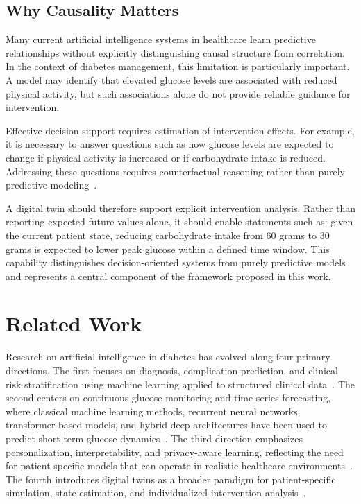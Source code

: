 \documentclass[journal]{IEEEtran}
\begin{document}
\subsection{Why Causality Matters}
Many current artificial intelligence systems in healthcare learn predictive relationships without explicitly distinguishing causal structure from correlation. In the context of diabetes management, this limitation is particularly important. A model may identify that elevated glucose levels are associated with reduced physical activity, but such associations alone do not provide reliable guidance for intervention.

Effective decision support requires estimation of intervention effects. For example, it is necessary to answer questions such as how glucose levels are expected to change if physical activity is increased or if carbohydrate intake is reduced. Addressing these questions requires counterfactual reasoning rather than purely predictive modeling~\cite{ref13,ref18,ref19}.

A digital twin should therefore support explicit intervention analysis. Rather than reporting expected future values alone, it should enable statements such as: given the current patient state, reducing carbohydrate intake from 60 grams to 30 grams is expected to lower peak glucose within a defined time window. This capability distinguishes decision-oriented systems from purely predictive models and represents a central component of the framework proposed in this work.

\section{Related Work}
Research on artificial intelligence in diabetes has evolved along four primary directions. The first focuses on diagnosis, complication prediction, and clinical risk stratification using machine learning applied to structured clinical data~\cite{ref1,ref2,ref3,ref16,ref17,ref27}. The second centers on continuous glucose monitoring and time-series forecasting, where classical machine learning methods, recurrent neural networks, transformer-based models, and hybrid deep architectures have been used to predict short-term glucose dynamics~\cite{ref9,ref10,ref23,ref24,ref25,ref30,ref31,ref32}. The third direction emphasizes personalization, interpretability, and privacy-aware learning, reflecting the need for patient-specific models that can operate in realistic healthcare environments~\cite{ref11,ref12,ref14,ref35,ref36,ref37}. The fourth introduces digital twins as a broader paradigm for patient-specific simulation, state estimation, and individualized intervention analysis~\cite{ref4,ref5,ref6,ref7,ref8,ref20,ref21,ref22,ref26}.
\end{document}
